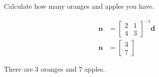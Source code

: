 Calculate how many oranges and apples you have.

\begin{solution}
    \begin{align*}
        \boldsymbol{n} &= \begin{bmatrix}
            2 & 1 \\
            4 & 3
        \end{bmatrix}^{-1}\boldsymbol{d} \\
        \boldsymbol{n} &= \begin{bmatrix}
            3 \\ 7
        \end{bmatrix}
    \end{align*}
    
    There are 3 oranges and 7 apples.
\end{solution}